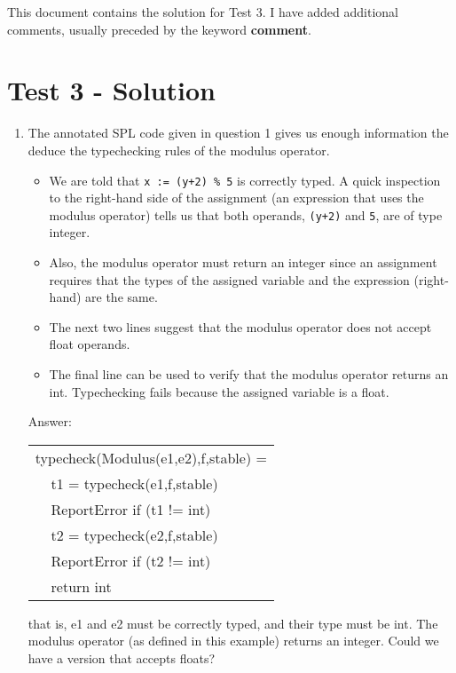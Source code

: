 \documentclass{article}
\newcommand{\comment}{\textbf{comment}}
\newcommand{\cuatro}{$\;\;\;\;$}
\begin{document}
\thispagestyle{empty}

\newcommand{\negra}[1]{\textbf{#1}}


This document contains the solution for Test 3. I have added additional comments, usually preceded by the keyword \comment.


\section*{Test 3 - Solution}

\begin{enumerate}

\item The annotated SPL code given in question 1 gives us enough information the deduce the typechecking rules of the modulus operator.
\begin{itemize}
\item We are told that \verb?x := (y+2) % 5? is correctly typed. A quick inspection to the right-hand side of the assignment (an expression that uses the modulus operator) tells us that both operands, \verb?(y+2)? and \verb?5?, are of type integer. 
\item Also, the modulus operator must return an integer since an assignment requires that the types of the assigned variable and the expression (right-hand) are the same.
\item The next two lines suggest that the modulus operator does not accept float operands.
\item The final line can be used to verify that the modulus operator returns an int. Typechecking fails because the assigned variable is a float.
\end{itemize}

Answer:\\
\begin{tabular}{l}
typecheck(Modulus(e1,e2),f,stable) = \\
\cuatro t1 = typecheck(e1,f,stable) \\
\cuatro ReportError if (t1 != int) \\
\cuatro t2 = typecheck(e2,f,stable) \\
\cuatro ReportError if (t2 != int) \\
\cuatro return int
\end{tabular}

that is, e1 and e2 must be correctly typed, and their type must be int. The modulus operator (as defined in this example) returns an integer. Could we have a version that accepts floats?


\end{enumerate}
\end{document}
